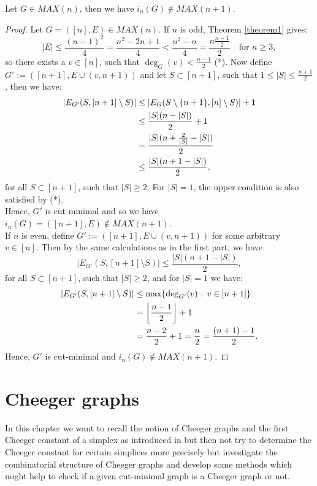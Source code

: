 \begin{prop}
Let \(G\in MAX(n)\), then we have \(i_n(G)\notin MAX(n+1)\).
\begin{proof}
Let \(G=([n],E)\in MAX(n)\). If \(n\) is odd, Theorem \ref{theorem1} gives:
\[
|E|\leq\frac{(n-1)^2}{4}=\frac{n^2-2n+1}{4}<\frac{n^2-n}{4}=\frac{n\frac{n-1}{2}}{2}\quad\text{for }n\geq 3,
\]
so there exists a \(v\in [n]\), such that \(\deg_G(v)<\frac{n-1}{2}\) (*). Now define\\
\(G':=([n+1],E\cup (v,n+1))\) and let \(S\subset [n+1]\), such that \(1\leq |S|\leq\frac{n+1}{2}\), then we have:
\begin{align}
|E_{G'}(S,[n+1]\setminus S)|&\leq |E_G(S\setminus\{n+1\},[n]\setminus S)|+1\notag\\
&\leq\frac{|S|(n-|S|)}{2}+1\notag\\
&=\frac{|S|(n+\frac{2}{|S|}-|S|)}{2}\notag\\
&\leq\frac{|S|(n+1-|S|)}{2},\notag
\end{align}
for all \(S\subset [n+1]\), such that \(|S|\geq 2\). For \(|S|=1\), the upper condition is also satisfied by (*).\\
Hence, \(G'\) is cut-minimal and so we have \(i_n(G)=([n+1],E)\notin MAX(n+1)\).\\
If \(n\) is even, define \(G':=([n+1],E\cup (v,n+1))\) for some arbitrary \(v\in [n]\). Then by the same calculations as in the first part, we have
\[
|E_{G'}(S,[n+1]\setminus S)|\leq\frac{|S|(n+1-|S|)}{2},
\]
for all \(S\subset [n+1]\), such that \(|S|\geq 2\), and for \(|S|=1\) we have:
\begin{align}
|E_{G'}(S,[n+1]\setminus S)|&\leq\text{max}\{\deg_{G'}(v)\text{ : }v\in[n+1]\}\notag\\
&=\left\lfloor\frac{n-1}{2}\right\rfloor +1\notag\\
&=\frac{n-2}{2}+1=\frac{n}{2}=\frac{(n+1)-1}{2}.\notag
\end{align}
Hence, \(G'\) is cut-minimal and \(i_n(G)\notin MAX(n+1)\).
\end{proof}
\end{prop}

\section{Cheeger graphs}
In this chapter we want to recall the notion of Cheeger graphs and the first Cheeger constant of a simplex as introduced in \cite{1} but then not try to determine the Cheeger constant for certain simplices more precisely but investigate the combinatorial structure of Cheeger graphs and develop some methods which might help to check if a given cut-minimal graph is a Cheeger graph or not.

